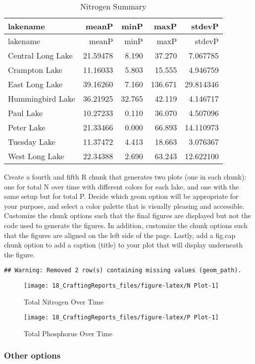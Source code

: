 \documentclass[
]{article}
\begin{document}
\begin{longtable}[]{@{}lrrrr@{}}
\caption{Nitrogen Summary}\tabularnewline
\toprule
lakename & meanP & minP & maxP & stdevP\tabularnewline
\midrule
\endfirsthead
\toprule
lakename & meanP & minP & maxP & stdevP\tabularnewline
\midrule
\endhead
Central Long Lake & 21.59478 & 8.190 & 37.270 & 7.067785\tabularnewline
Crampton Lake & 11.16033 & 5.803 & 15.555 & 4.946759\tabularnewline
East Long Lake & 39.16260 & 7.160 & 136.671 & 29.814346\tabularnewline
Hummingbird Lake & 36.21925 & 32.765 & 42.119 & 4.146717\tabularnewline
Paul Lake & 10.27233 & 0.110 & 36.070 & 4.507096\tabularnewline
Peter Lake & 21.33466 & 0.000 & 66.893 & 14.110973\tabularnewline
Tuesday Lake & 11.37472 & 4.413 & 18.663 & 3.076367\tabularnewline
West Long Lake & 22.34388 & 2.690 & 63.243 & 12.622100\tabularnewline
\bottomrule
\end{longtable}

Create a fourth and fifth R chunk that generates two plots (one in each
chunk): one for total N over time with different colors for each lake,
and one with the same setup but for total P. Decide which geom option
will be appropriate for your purpose, and select a color palette that is
visually pleasing and accessible. Customize the chunk options such that
the final figures are displayed but not the code used to generate the
figures. In addition, customize the chunk options such that the figures
are aligned on the left side of the page. Lastly, add a fig.cap chunk
option to add a caption (title) to your plot that will display
underneath the figure.

\begin{verbatim}
## Warning: Removed 2 row(s) containing missing values (geom_path).
\end{verbatim}

\begin{figure}

\texttt{[image: 18\_CraftingReports\_files/figure-latex/N Plot-1]} \hfill{}

\caption{Total Nitrogen Over Time}\label{fig:N Plot}
\end{figure}

\begin{figure}

\texttt{[image: 18\_CraftingReports\_files/figure-latex/P Plot-1]} \hfill{}

\caption{Total Phosphorus Over Time}\label{fig:P Plot}
\end{figure}

\hypertarget{other-options}{%
\subsubsection{Other options}\label{other-options}}
\end{document}
